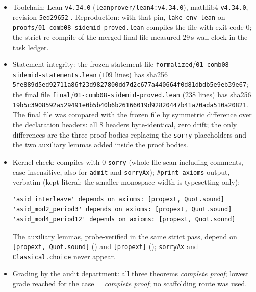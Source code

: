 \documentclass[11pt]{article}
\theoremstyle{definition}
\begin{document}
\begin{itemize}
\item Toolchain: Lean \texttt{v4.34.0}
(\texttt{leanprover/lean4:v4.34.0}), mathlib4 \texttt{v4.34.0}, revision
\texttt{5ed29652} \cite{lean4,mathlib,mathlib-v434}. Reproduction: with that
pin, \texttt{lake env lean} on \texttt{proofs/01-comb08-sidemid-proved.lean}
compiles the file with exit code $0$; the strict re-compile of the merged
final file measured $29$\,s wall clock in the task ledger.
\item Statement integrity: the frozen statement file
\texttt{formalized}\allowbreak/\texttt{01-comb08-sidemid-statements.lean}
($109$ lines) has sha256
\texttt{5fe889d5}\allowbreak\texttt{ed92711a}\allowbreak\texttt{86f23d98}\allowbreak\texttt{27800dd7}\allowbreak\texttt{d2c677a4}\allowbreak\texttt{40664f0d}\allowbreak\texttt{81dbdb5e}\allowbreak\texttt{9eb39e67};
the final file
\texttt{final}\allowbreak/\texttt{01-comb08-sidemid-proved.lean}
($238$ lines) has sha256
\texttt{19b5c390}\allowbreak\texttt{8592a529}\allowbreak\texttt{491e0b5b}\allowbreak\texttt{40b6b261}\allowbreak\texttt{66019d92}\allowbreak\texttt{820447b4}\allowbreak\texttt{1a70ada5}\allowbreak\texttt{10a20821}.
The final file was compared with the frozen file by symmetric difference over
the declaration headers: all $8$ headers byte-identical, zero drift; the only
differences are the three proof bodies replacing the \texttt{sorry}
placeholders and the two auxiliary lemmas added inside the proof bodies.
\item Kernel check: compiles with $0$ \texttt{sorry} (whole-file scan
including comments, case-insensitive, also for \texttt{admit} and
\texttt{sorryAx}); \texttt{\#print axioms} output, verbatim (kept literal;
the smaller monospace width is typesetting only):
\begin{lstlisting}[basicstyle=\ttfamily\footnotesize,frame=none]
'asid_interleave' depends on axioms: [propext, Quot.sound]
'asid_mod2_period3' depends on axioms: [propext, Quot.sound]
'asid_mod4_period12' depends on axioms: [propext, Quot.sound]
\end{lstlisting}
The auxiliary lemmas, probe-verified in the same strict pass, depend on
\texttt{[propext, Quot.sound]} () and \texttt{[propext]}
(); \texttt{sorryAx} and \texttt{Classical.choice} never
appear.
\item Grading by the audit department: all three theorems \emph{complete
proof}; lowest grade reached for the case = \emph{complete proof}; no
scaffolding route was used.

\end{itemize}
\end{document}
